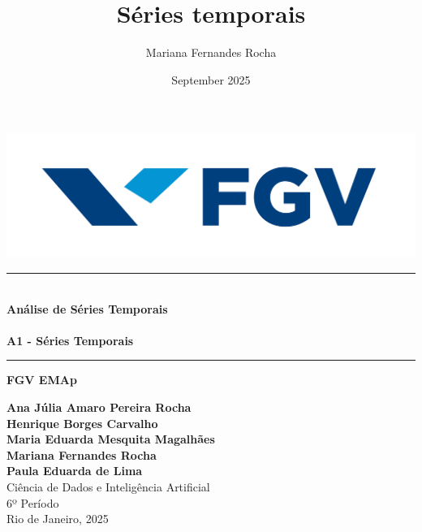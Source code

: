 \documentclass{article}
\title{Séries temporais}
\author{Mariana Fernandes Rocha}
\date{September 2025}
\begin{document}
\begin{titlepage}
    \begin{center}

        \vspace{1cm}
        \begin{minipage}{0.45\textwidth}
            \centering
            \includegraphics[width=1.2\textwidth]{images/logo_fgv.png}    
        \end{minipage}
        \vspace{2cm}

        \rule{1\textwidth}{0.4pt} \\ %
        \vspace{0.2cm}
        {\Huge \textbf{Análise de Séries Temporais}} \\
        \vspace{0.2cm}
        \vspace{0.5cm}\\
        {\Large \textbf{A1 - Séries Temporais}}\\
        \rule{1\textwidth}{0.4pt} %


        \vspace{0.5cm}
        {\Large \textbf{FGV EMAp}} \\
        \vspace{2cm}
        
        

        
        
        
        {\large 
            \textbf{Ana Júlia Amaro Pereira Rocha} \\ 
            \textbf{Henrique Borges Carvalho} \\
            \textbf{Maria Eduarda Mesquita Magalhães}\\
            \textbf{Mariana Fernandes Rocha} \\
            \textbf{Paula Eduarda de Lima}}\\[1.5cm]
        
        {\large 
            Ciência de Dados e Inteligência Artificial \\ 
            6º Período}\\[2cm]
        
        \vfill
        {\large Rio de Janeiro, 2025}

        
    \end{center}
\end{titlepage}
\end{document}
